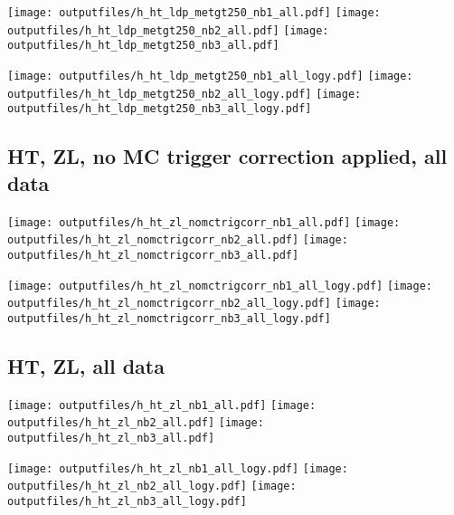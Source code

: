 \documentclass[11pt]{article}
\begin{document}
    \noindent
     \texttt{[image: outputfiles/h\_ht\_ldp\_metgt250\_nb1\_all.pdf]}
     \texttt{[image: outputfiles/h\_ht\_ldp\_metgt250\_nb2\_all.pdf]}
     \texttt{[image: outputfiles/h\_ht\_ldp\_metgt250\_nb3\_all.pdf]}

    \noindent
     \texttt{[image: outputfiles/h\_ht\_ldp\_metgt250\_nb1\_all\_logy.pdf]}
     \texttt{[image: outputfiles/h\_ht\_ldp\_metgt250\_nb2\_all\_logy.pdf]}
     \texttt{[image: outputfiles/h\_ht\_ldp\_metgt250\_nb3\_all\_logy.pdf]}


     \subsection{ HT, ZL, no MC trigger correction applied, all data}

    \noindent
     \texttt{[image: outputfiles/h\_ht\_zl\_nomctrigcorr\_nb1\_all.pdf]}
     \texttt{[image: outputfiles/h\_ht\_zl\_nomctrigcorr\_nb2\_all.pdf]}
     \texttt{[image: outputfiles/h\_ht\_zl\_nomctrigcorr\_nb3\_all.pdf]}

    \noindent
     \texttt{[image: outputfiles/h\_ht\_zl\_nomctrigcorr\_nb1\_all\_logy.pdf]}
     \texttt{[image: outputfiles/h\_ht\_zl\_nomctrigcorr\_nb2\_all\_logy.pdf]}
     \texttt{[image: outputfiles/h\_ht\_zl\_nomctrigcorr\_nb3\_all\_logy.pdf]}


     \subsection{ HT, ZL, all data}

    \noindent
     \texttt{[image: outputfiles/h\_ht\_zl\_nb1\_all.pdf]}
     \texttt{[image: outputfiles/h\_ht\_zl\_nb2\_all.pdf]}
     \texttt{[image: outputfiles/h\_ht\_zl\_nb3\_all.pdf]}

    \noindent
     \texttt{[image: outputfiles/h\_ht\_zl\_nb1\_all\_logy.pdf]}
     \texttt{[image: outputfiles/h\_ht\_zl\_nb2\_all\_logy.pdf]}
     \texttt{[image: outputfiles/h\_ht\_zl\_nb3\_all\_logy.pdf]}


   \clearpage

\end{document}
